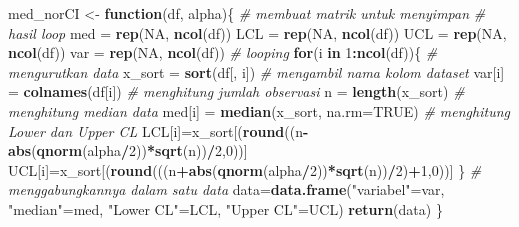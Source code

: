 \documentclass[]{book}
\newenvironment{Shaded}{\begin{snugshade}}{\end{snugshade}}
\newcommand{\KeywordTok}[1]{\textcolor[rgb]{0.13,0.29,0.53}{\textbf{#1}}}
\newcommand{\DataTypeTok}[1]{\textcolor[rgb]{0.13,0.29,0.53}{#1}}
\newcommand{\DecValTok}[1]{\textcolor[rgb]{0.00,0.00,0.81}{#1}}
\newcommand{\StringTok}[1]{\textcolor[rgb]{0.31,0.60,0.02}{#1}}
\newcommand{\CommentTok}[1]{\textcolor[rgb]{0.56,0.35,0.01}{\textit{#1}}}
\newcommand{\OtherTok}[1]{\textcolor[rgb]{0.56,0.35,0.01}{#1}}
\newcommand{\ControlFlowTok}[1]{\textcolor[rgb]{0.13,0.29,0.53}{\textbf{#1}}}
\newcommand{\OperatorTok}[1]{\textcolor[rgb]{0.81,0.36,0.00}{\textbf{#1}}}
\newcommand{\NormalTok}[1]{#1}
\begin{document}
\begin{Shaded}
\begin{Highlighting}[]
\NormalTok{med_norCI <-}\StringTok{ }\ControlFlowTok{function}\NormalTok{(df, alpha)\{}
  \CommentTok{# membuat matrik untuk menyimpan}
  \CommentTok{# hasil loop}
\NormalTok{  med =}\StringTok{ }\KeywordTok{rep}\NormalTok{(}\OtherTok{NA}\NormalTok{, }\KeywordTok{ncol}\NormalTok{(df))}
\NormalTok{  LCL =}\StringTok{ }\KeywordTok{rep}\NormalTok{(}\OtherTok{NA}\NormalTok{, }\KeywordTok{ncol}\NormalTok{(df))}
\NormalTok{  UCL =}\StringTok{ }\KeywordTok{rep}\NormalTok{(}\OtherTok{NA}\NormalTok{, }\KeywordTok{ncol}\NormalTok{(df))}
\NormalTok{  var =}\StringTok{ }\KeywordTok{rep}\NormalTok{(}\OtherTok{NA}\NormalTok{, }\KeywordTok{ncol}\NormalTok{(df))}
  \CommentTok{# looping}
  \ControlFlowTok{for}\NormalTok{(i }\ControlFlowTok{in} \DecValTok{1}\OperatorTok{:}\KeywordTok{ncol}\NormalTok{(df))\{}
    \CommentTok{# mengurutkan data}
\NormalTok{    x_sort =}\StringTok{ }\KeywordTok{sort}\NormalTok{(df[, i])}
    \CommentTok{# mengambil nama kolom dataset}
\NormalTok{    var[i] =}\StringTok{ }\KeywordTok{colnames}\NormalTok{(df[i])}
    \CommentTok{# menghitung jumlah observasi}
\NormalTok{    n =}\StringTok{ }\KeywordTok{length}\NormalTok{(x_sort)}
    \CommentTok{# menghitung median data}
\NormalTok{    med[i] =}\StringTok{ }\KeywordTok{median}\NormalTok{(x_sort, }\DataTypeTok{na.rm=}\OtherTok{TRUE}\NormalTok{)}
    \CommentTok{# menghitung Lower dan Upper CL}
\NormalTok{    LCL[i]=x_sort[(}\KeywordTok{round}\NormalTok{((n}\OperatorTok{-}\KeywordTok{abs}\NormalTok{(}\KeywordTok{qnorm}\NormalTok{(alpha}\OperatorTok{/}\DecValTok{2}\NormalTok{))}\OperatorTok{*}\KeywordTok{sqrt}\NormalTok{(n))}\OperatorTok{/}\DecValTok{2}\NormalTok{,}\DecValTok{0}\NormalTok{))]}
\NormalTok{    UCL[i]=x_sort[(}\KeywordTok{round}\NormalTok{(((n}\OperatorTok{+}\KeywordTok{abs}\NormalTok{(}\KeywordTok{qnorm}\NormalTok{(alpha}\OperatorTok{/}\DecValTok{2}\NormalTok{))}\OperatorTok{*}\KeywordTok{sqrt}\NormalTok{(n))}\OperatorTok{/}\DecValTok{2}\NormalTok{)}\OperatorTok{+}\DecValTok{1}\NormalTok{,}\DecValTok{0}\NormalTok{))]}
\NormalTok{  \}}
  \CommentTok{# menggabungkannya dalam satu data}
\NormalTok{  data=}\KeywordTok{data.frame}\NormalTok{(}\StringTok{"variabel"}\NormalTok{=var,}
                  \StringTok{"median"}\NormalTok{=med,}
                  \StringTok{"Lower CL"}\NormalTok{=LCL,}
                  \StringTok{"Upper CL"}\NormalTok{=UCL)}
  \KeywordTok{return}\NormalTok{(data)}
\NormalTok{\}}
\end{Highlighting}
\end{Shaded}
\end{document}
